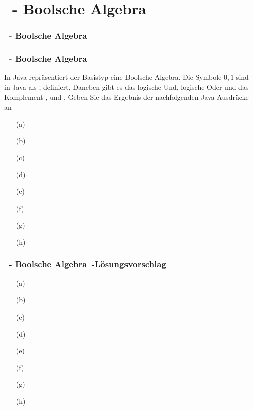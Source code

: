 \def\stitle{\theexercise\ - Boolsche Algebra}
\section{\stitle}
\begin{frame}
    \frametitle{\stitle}%
\tableofcontents[current]
\end{frame}

\begin{frame}[t]
  \frametitle{\stitle}


In Java repräsentiert der Basistyp  eine Boolsche Algebra.
Die Symbole $0, 1$ sind in Java als ,  definiert.
Daneben gibt es das logische Und, logische Oder und das Komplement \code{\&\&}, \code{||} und \code{!}.
Geben Sie das Ergebnis der nachfolgenden Java-Ausdrücke an
\medskip

\begin{minipage}{0.49\textwidth}
\begin{itemize}
\item[(a)] 
\item[(b)] 
\item[(c)] 
\item[(d)] 
\end{itemize}
\end{minipage}
\begin{minipage}{0.49\textwidth}
\begin{itemize}
\item[(e)] 
\item[(f)] 
\item[(g)] 
\item[(h)] 
\end{itemize}
\end{minipage}
\end{frame}

\begin{frame}[t]
  \frametitle{\stitle\ -L\"osungsvorschlag}
\begin{center}
\begin{minipage}{0.49\textwidth}
\begin{itemize}
\item[(a)] 
\item[(b)] 
\item[(c)] 
\item[(d)] 
\end{itemize}
\end{minipage}
\begin{minipage}{0.49\textwidth}
\begin{itemize}
\item[(e)] 
\item[(f)] 
\item[(g)] 
\item[(h)] 
\end{itemize}
\end{minipage}
\end{center}

\end{frame}

